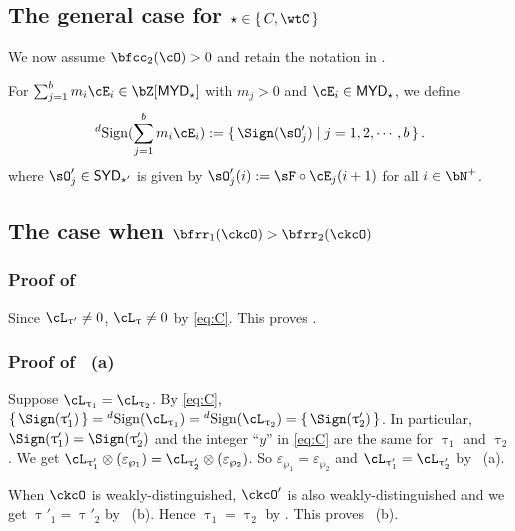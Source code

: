 \documentclass[12pt,a4paper]{amsart}
\def\SYD{{\mathsf{SYD}}}
\def\MYD{{\mathsf{MYD}}}
\numberwithin{equation}{section}
\theoremstyle{remark}
\begin{document}




\subsection{The general case for $\star\in \set{C,\wtC}$}
We now assume $\bfcc_{2}(\cO)>0$ and retain the notation in .

For $\sum_{j=1}^{b} m_{i} \cE_{i}\in \bZ[\MYD_{\star}]$ with $m_{j}>0$ and
$\cE_{i}\in \MYD_{\star}$, we define
\[
  \dsign(\sum_{j=1}^{b} m_{i} \cE_{i}) := \set{\Sign(\sO'_{j})|j=1,2,\cdots, b}.
\] where  $\sO'_{j} \in \SYD_{\star'}$ is given by $\sO'_{j}(i) := \sF\circ \cE_{j}(i+1)$ for all
$i\in \bN^{+}$.

\medskip

\subsection*{The case when $\bfrr_{1}(\ckcO)>\bfrr_{2}(\ckcO)$}

\subsubsection*{Proof of }
Since $\ac_{\uptau'}\neq 0$, $\ac_{\uptau}\neq 0$ by \eqref{eq:C}. This proves .


\smallskip

\subsubsection*{Proof of ~(a)}
Suppose $\ac_{\uptau_{1}}=\ac_{\uptau_{2}}$. By \eqref{eq:C},
$\set{\Sign(\uptau'_{1})}=\dsign(\ac_{\uptau_{1}}) =\dsign(\ac_{\uptau_{2}}) = \set{\Sign(\uptau'_{2})}$.
In particular, $\Sign(\uptau'_{1})=\Sign(\uptau'_{2})$ and the integer ``$y$'' in \eqref{eq:C} are the same for $\uptau_{1}$
and $\uptau_{2}$. We get
$\ac_{\uptau'_{1}}\otimes (\varepsilon_{\wp_{1}})=\ac_{\uptau'_{2}}\otimes (\varepsilon_{\wp_{2}})$.
So $\varepsilon_{\wp_{1}}=\varepsilon_{\wp_{2}}$ and $\ac_{\uptau'_{1}}=\ac_{\uptau'_{2}}$ by ~(a).


\smallskip

When $\ckcO$ is weakly-distinguished, $\ckcO'$ is also weakly-distinguished and  we get $\uptau'_{1}=\uptau'_{2}$ by
~(b). Hence $\uptau_{1}=\uptau_{2}$ by . This
proves ~(b).
\end{document}
